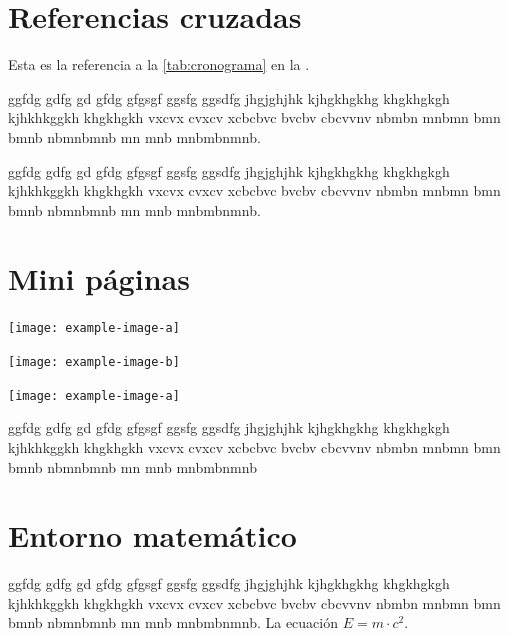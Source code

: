 \documentclass[a4paper, 12pt]{article}
\begin{document}
	\newpage
	\section{Referencias cruzadas}
	Esta es la referencia a la \autoref{tab:cronograma} en la .
	
	ggfdg gdfg gd gfdg gfgsgf ggsfg ggsdfg jhgjghjhk kjhgkhgkhg khgkhgkgh kjhkhkggkh khgkhgkh vxcvx cvxcv xcbcbvc bvcbv cbcvvnv nbmbn mnbmn bmn bmnb nbmnbmnb mn mnb mnbmbnmnb.
	
	ggfdg gdfg gd gfdg gfgsgf ggsfg ggsdfg jhgjghjhk kjhgkhgkhg khgkhgkgh kjhkhkggkh khgkhgkh vxcvx cvxcv xcbcbvc bvcbv cbcvvnv nbmbn mnbmn bmn bmnb nbmnbmnb mn mnb mnbmbnmnb.
	
	\section{Mini páginas}
	\begin{center}
		\begin{minipage}{0.47\linewidth} %
		\texttt{[image: example-image-a]}
	\end{minipage}
	\begin{minipage}{0.47\linewidth}
		\texttt{[image: example-image-b]}
	\end{minipage}
	\end{center}
	
	\begin{center}
		\begin{minipage}{0.47\linewidth} %
			\texttt{[image: example-image-a]}
		\end{minipage}\hfil
		\begin{minipage}{0.3\linewidth}
			ggfdg gdfg gd gfdg gfgsgf ggsfg ggsdfg jhgjghjhk kjhgkhgkhg khgkhgkgh kjhkhkggkh khgkhgkh vxcvx cvxcv xcbcbvc bvcbv cbcvvnv nbmbn mnbmn bmn bmnb nbmnbmnb mn mnb mnbmbnmnb
		\end{minipage}
	\end{center}
	
	\section{Entorno matemático}
	ggfdg gdfg gd gfdg gfgsgf ggsfg ggsdfg jhgjghjhk kjhgkhgkhg khgkhgkgh kjhkhkggkh khgkhgkh vxcvx cvxcv xcbcbvc bvcbv cbcvvnv nbmbn mnbmn bmn bmnb nbmnbmnb mn mnb mnbmbnmnb. La ecuación $ E = m \cdot c^2 $.
	
\end{document}
